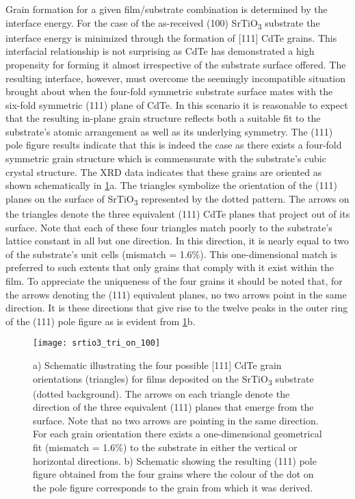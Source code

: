 Grain formation for a given film/substrate combination is
determined by the interface energy. For the case of the as-received
(100) SrTiO\textsubscript{3} substrate the interface energy is minimized through
the formation of [111] CdTe grains. This interfacial relationship is
not surprising as CdTe has demonstrated a high propensity for
forming it almost irrespective of the substrate surface offered\cite{Neretina2006}.
The resulting interface, however, must overcome the seemingly
incompatible situation brought about when the four-fold symmetric substrate surface mates with the six-fold symmetric (111)
plane of CdTe. In this scenario it is reasonable to expect that the
resulting in-plane grain structure reflects both a suitable fit to the
substrate’s atomic arrangement as well as its underlying symmetry. The (111) pole figure results indicate that this is indeed the
case as there exists a four-fold symmetric grain structure which is
commensurate with the substrate’s cubic crystal structure. The
XRD data indicates that these grains are oriented as shown
schematically in \cref{fig:srtio3_tri_on_100}a. The triangles symbolize the orientation of
the (111) planes on the surface of SrTiO\textsubscript{3} represented by the
dotted pattern. The arrows on the triangles denote the three
equivalent (111) CdTe planes that project out of its surface. Note
that each of these four triangles match poorly to the substrate’s
lattice constant in all but one direction. In this direction, it is nearly
equal to two of the substrate’s unit cells (mismatch = 1.6\%). This
one-dimensional match is preferred to such extents that only
grains that comply with it exist within the film. To appreciate the
uniqueness of the four grains it should be noted that, for the arrows
denoting the (111) equivalent planes, no two arrows point in the
same direction. It is these directions that give rise to the twelve
peaks in the outer ring of the (111) pole figure as is evident from
\cref{fig:srtio3_tri_on_100}b.
\begin{figure}
    \centering
    \texttt{[image: srtio3\_tri\_on\_100]}
    \caption[CdTe grains on (100) SrTiO\textsubscript{3}]{\label{fig:srtio3_tri_on_100}a) Schematic illustrating the four possible [111] CdTe grain orientations (triangles) for films deposited on the SrTiO\textsubscript{3} substrate (dotted background). The arrows on
        each triangle denote the direction of the three equivalent (111) planes that emerge from the surface. Note that no two arrows are pointing in the same direction. For each
        grain orientation there exists a one-dimensional geometrical fit (mismatch = 1.6\%) to the substrate in either the vertical or horizontal directions. b) Schematic showing the
        resulting (111) pole figure obtained from the four grains where the colour of the dot on the pole figure corresponds to the grain from which it was derived.}
\end{figure}
